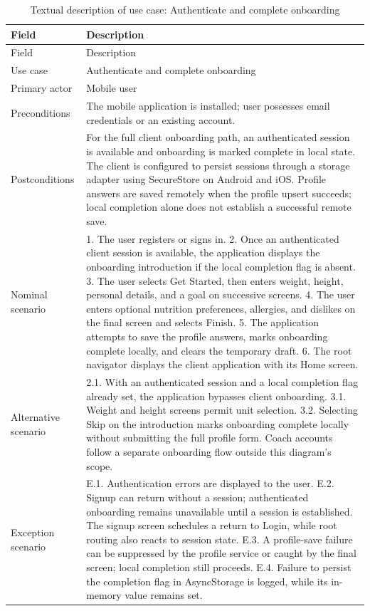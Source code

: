 \documentclass[12pt,a4paper,openany]{report}
\begin{document}
\begingroup
\footnotesize
\setlength{\tabcolsep}{3pt}
\renewcommand{\arraystretch}{1.20}
\setlength{\LTpre}{5pt}
\setlength{\LTpost}{10pt}
\begin{longtable}{|L{4.95cm}|L{10.05cm}|}
\caption{Textual description of use case: Authenticate and complete onboarding}\label{tab:pdf-37-18} \\
\hline
{}
Field & Description \\ \hline
\endfirsthead
\hline
{}
Field & Description \\ \hline
\endhead
Use case & Authenticate and complete onboarding \\ \hline
Primary actor & Mobile user \\ \hline
Preconditions & The mobile application is installed; user possesses email credentials or an existing account. \\ \hline
Postconditions & For the full client onboarding path, an authenticated session is available and onboarding is marked complete in local state. The client is configured to persist sessions through a storage adapter using SecureStore on Android and iOS. Profile answers are saved remotely when the profile upsert succeeds; local completion alone does not establish a successful remote save. \\ \hline
Nominal scenario & 1. The user registers or signs in. 2. Once an authenticated client session is available, the application displays the onboarding introduction if the local completion flag is absent. 3. The user selects Get Started, then enters weight, height, personal details, and a goal on successive screens. 4. The user enters optional nutrition preferences, allergies, and dislikes on the final screen and selects Finish. 5. The application attempts to save the profile answers, marks onboarding complete locally, and clears the temporary draft. 6. The root navigator displays the client application with its Home screen. \\ \hline
Alternative scenario & 2.1. With an authenticated session and a local completion flag already set, the application bypasses client onboarding. 3.1. Weight and height screens permit unit selection. 3.2. Selecting Skip on the introduction marks onboarding complete locally without submitting the full profile form. Coach accounts follow a separate onboarding flow outside this diagram's scope. \\ \hline
Exception scenario & E.1. Authentication errors are displayed to the user. E.2. Signup can return without a session; authenticated onboarding remains unavailable until a session is established. The signup screen schedules a return to Login, while root routing also reacts to session state. E.3. A profile-save failure can be suppressed by the profile service or caught by the final screen; local completion still proceeds. E.4. Failure to persist the completion flag in AsyncStorage is logged, while its in-memory value remains set. \\ \hline
\end{longtable}
\endgroup
\end{document}
